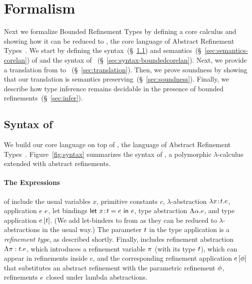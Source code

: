 \section{Formalism}\label{sec:check}

Next we formalize Bounded Refinement Types by defining
a core calculus \boundedcorelan and showing how it can
be reduced to \corelan, the core language of Abstract
Refinement Types~\citep{vazou13}.
%
We start by defining the syntax~(\S~\ref{sec:syntax-corelan})
and semantics~(\S~\ref{sec:semantics-corelan}) of \corelan
and the syntax of \boundedcorelan~(\S~\ref{sec:syntax-boundedcorelan}).
%
Next, we provide a translation from \boundedcorelan to
\corelan ~(\S~\ref{sec:translation}).
%
Then, we prove soundness by showing that our translation
is semantics preserving~(\S~\ref{sec:soundness}).
%
Finally, we describe how type inference remains
decidable in the presence of bounded refinements~(\S~\ref{sec:infer}).


\subsection{Syntax of \corelan}\label{sec:syntax-corelan}



We build our core language on top of \corelan, the language
of Abstract Refinement Types~\citep{vazou13}.
%
Figure~\ref{fig:syntax} summarizes the syntax of \corelan,
a polymorphic $\lambda$-calculus extended with abstract
refinements.

\paragraph{The Expressions} of \corelan include the usual variables $x$,
primitive constants $c$, $\lambda$-abstraction $\lambda {x\!:\!t}. e$,
application ${e} \ {e}$,
let bindings $\mathsf{let} \ {x\!:\!t} = e \ \mathsf{in} \ e$,
type abstraction $\Lambda \alpha . e$,
and type application ${e} \left[ {t}\right]$.
(We add let-binders to \corelan
from \cite{vazou13} as they can be reduced to $\lambda$-abstractions
in the usual way.)
%
The parameter $t$ in the type application is a \emph{refinement
type}, as described shortly.  Finally, \corelan includes refinement
abstraction $\Lambda {\pi:t} . e$, which introduces a refinement
variable $\pi$ (with its type $t$), which
can appear in refinements inside $e$, and the corresponding refinement
application ${e} \left[ \phi\right]$ that substitutes an abstract refinement
with the parametric refinement $\phi$, \ie
refinements $e$ closed under lambda abstractions.

